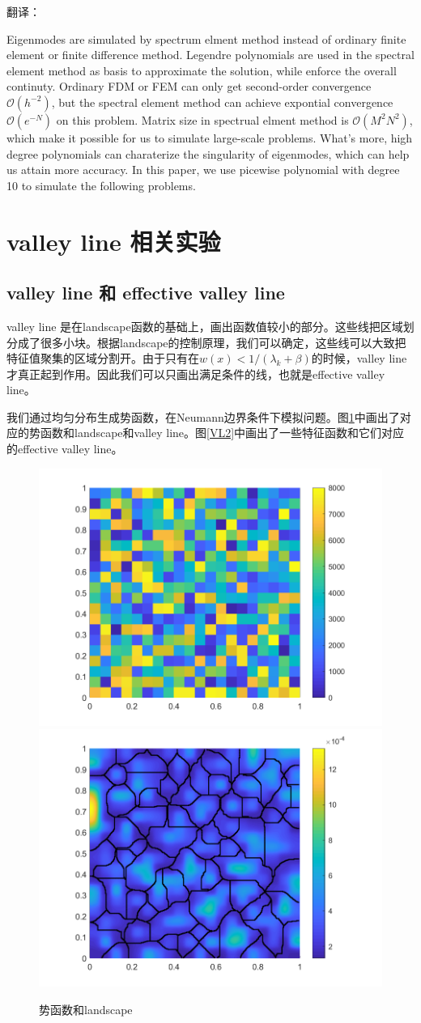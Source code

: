 \documentclass[12pt,a4paper]{article}
\begin{document}
翻译：

Eigenmodes are simulated by spectrum elment method instead of ordinary finite element or finite difference method. Legendre polynomials are used in the spectral element method as basis to approximate the solution, while enforce the overall continuty. Ordinary FDM or FEM can only get second-order convergence $\mathcal{O}(h^{-2})$, but the spectral element method can achieve expontial convergence $\mathcal{O}(e^{-N})$ on this problem. Matrix size in spectrual elment method is $\mathcal{O}(M^2 N^2)$, which make it possible for us to simulate large-scale problems. What's more, high degree polynomials can charaterize the singularity of eigenmodes, which can help us attain more accuracy. In this paper, we use picewise polynomial with degree 10 to simulate the following problems.

\section{valley line 相关实验}\label{valley}

\subsection{valley line 和 effective valley line}

valley line 是在landscape函数的基础上，画出函数值较小的部分。这些线把区域划分成了很多小块。根据landscape的控制原理，我们可以确定，这些线可以大致把特征值聚集的区域分割开。由于只有在$w(x) < 1/(\lambda_k + \beta)$的时候，valley line 才真正起到作用。因此我们可以只画出满足条件的线，也就是effective valley line。

我们通过均匀分布生成势函数，在Neumann边界条件下模拟问题。图\ref{VL1}中画出了对应的势函数和landscape和valley line。图\ref{VL2}中画出了一些特征函数和它们对应的effective valley line。

\begin{figure}[htbp]
\centering
\includegraphics[width=0.3\linewidth]{valley/V}
\includegraphics[width=0.3\linewidth]{valley/W}
\caption{势函数和landscape}
\label{VL1}
\end{figure}
\end{document}
